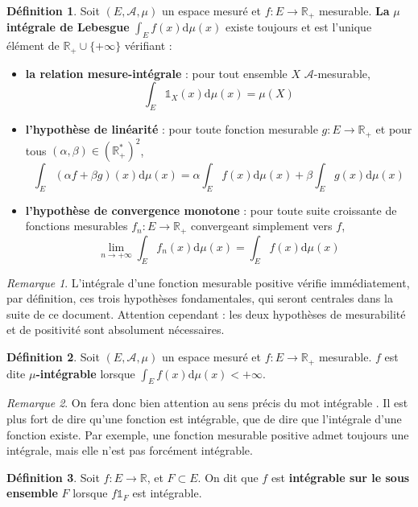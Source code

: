 \documentclass[french]{report}
\theoremstyle{plain}
\theoremstyle{definition}
\newtheorem{defi}{Définition}[section]
\theoremstyle{remark}
\newtheorem{rem}{Remarque}[section]
\newcommand\itemb{\item[$\bullet$]}
\begin{document}
\begin{defi}
  Soit $\left(E,\mathcal{A},\mu\right)$ un espace mesuré et $f:E\rightarrow\mathbb{R}_+$ mesurable.
  \textbf{La} $\mu $\textbf{ intégrale de Lebesgue } $\displaystyle\int_Ef(x)\text{d}\mu(x)$ existe toujours et est l'unique élément de $\mathbb{R}_+\cup\{+\infty\}$ vérifiant :
  \begin{itemize}
    \itemb \textbf{la relation mesure-intégrale} : pour tout ensemble $X$ $\mathcal{A}$-mesurable,
    $$
    \int_E\mathds{1}_X(x)\text{d}\mu(x)=\mu(X)
    $$ 
    \itemb \textbf{l'hypothèse de linéarité} : pour toute fonction mesurable $g:E\rightarrow\mathbb{R}_+$ et pour tous $\left(\alpha,\beta\right) \in \left(\mathbb{R}_+^*\right)^2$,
    $$
    \int_E (\alpha f + \beta g)(x) \text{d}\mu(x)=\alpha\int_Ef(x)\text{d}\mu(x) + \beta\int_Eg(x)\text{d}\mu(x)
    $$
    \itemb \textbf{l'hypothèse de convergence monotone} : pour toute suite croissante de fonctions mesurables $f_n:E\rightarrow\mathbb{R}_+$ convergeant simplement vers $f$,
    $$
    \lim_{n\rightarrow+\infty}\int_Ef_n(x)\text{d}\mu(x)=\int_Ef(x)\text{d}\mu(x)
    $$
  \end{itemize}
\end{defi}

\begin{rem}
  L'intégrale d'une fonction mesurable positive vérifie immédiatement, par définition, ces trois hypothèses fondamentales, qui seront centrales dans la suite de ce document.
  Attention cependant : les deux hypothèses de mesurabilité et de positivité sont absolument nécessaires.
\end{rem}

\begin{defi}
  Soit $\left(E,\mathcal{A},\mu\right)$ un espace mesuré et $f:E\rightarrow\mathbb{R}_+$ mesurable.
  $f$ est dite $\mu$\textbf{-intégrable} lorsque $\displaystyle\int_Ef(x)\text{d}\mu(x) < +\infty$.
\end{defi}

\begin{rem}
  \label{rem:attint}
  On fera donc bien attention au sens précis du mot \og intégrable \fg.
  Il est plus fort de dire qu'une fonction est intégrable, que de dire que l'intégrale d'une fonction existe.
  Par exemple, une fonction mesurable positive admet toujours une intégrale, mais elle n'est pas forcément intégrable.
\end{rem}

\begin{defi}
  Soit $f:E\longrightarrow\mathbb{R}$, et $F\subset E$.
  On dit que $f$ est \textbf{intégrable sur le sous ensemble} $F$ lorsque $f\mathds{1}_F$ est intégrable.
\end{defi}
\end{document}
